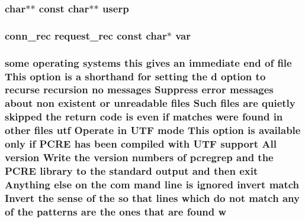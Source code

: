 \subsubsection[{\texorpdfstring{userp}{userp}}]{\setlength{\rightskip}{0pt plus 5cm}char$\ast$$\ast$ const char$\ast$$\ast$ userp}\hypertarget{group__MOD__PROXY_gafab7f01dc92afd3e79a59fe3a2ea5932}{}\label{group__MOD__PROXY_gafab7f01dc92afd3e79a59fe3a2ea5932}
\subsubsection[{\texorpdfstring{var}{var}}]{ {\bf conn\+\_\+rec} {\bf request\+\_\+rec} const char$\ast$ var}\hypertarget{group__MOD__PROXY_ga81bb7fed3eaa4dd24455759f1cb26176}{}\label{group__MOD__PROXY_ga81bb7fed3eaa4dd24455759f1cb26176}
\subsubsection[{\texorpdfstring{w}{w}}]{ some operating {\bf systems} {\bf this} gives an immediate {\bf end} {\bf of} {\bf file} This {\bf option} {\bf is} {\bf a} shorthand for {\bf setting} the {\bf d} {\bf option} {\bf to} {\bf recurse} {\bf recursion} no messages Suppress {\bf error} messages about non existent {\bf or} unreadable {\bf files} Such {\bf files} {\bf are} {\bf quietly} skipped the return {\bf code} {\bf is} even {\bf if} {\bf matches} were {\bf found} {\bf in} other {\bf files} utf Operate {\bf in} U\+TF {\bf mode} This {\bf option} {\bf is} {\bf available} only {\bf if} {\bf P\+C\+RE} has been {\bf compiled} {\bf with} U\+TF {\bf support} All version Write the version numbers {\bf of} pcregrep and the {\bf P\+C\+RE} {\bf library} {\bf to} the standard {\bf output} and then {\bf exit} Anything else {\bf on} the com mand {\bf line} {\bf is} {\bf ignored} invert {\bf match} Invert the sense {\bf of} the {\bf so} that {\bf lines} {\bf which} {\bf do} {\bf not} {\bf match} {\bf any} {\bf of} the {\bf patterns} {\bf are} the ones that {\bf are} {\bf found} w}\hypertarget{group__MOD__PROXY_gab9a0c51666082a4ca5dd995ee972f77e}{}\label{group__MOD__PROXY_gab9a0c51666082a4ca5dd995ee972f77e}
